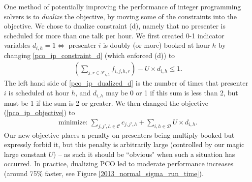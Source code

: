 \documentclass{svjour3}                     %
\begin{document}
One method of potentially improving the performance of integer programming solvers is to \emph{dualize} the objective, by moving some of the constraints into the objective. We chose to dualize constraint (d), namely that no presenter is scheduled for more than one talk per hour. We first created 0-1 indicator variables $d_{i,h} = 1 \iff $ presenter $i$ is doubly (or more) booked at hour $h$ by changing \ref{pco_ip_constraint_d} (which enforced (d)) to
\begin{gather}
	\left( \sum_{j,r \in \mathcal F_{i,h}} f_{i,j,h,r} \right) - U \times d_{i,h} \le 1. \label{pco_ip_dualized_d}
\end{gather}
The left hand side of \ref{pco_ip_dualized_d} is the number of times that presenter $i$ is scheduled at hour $h$, and $d_{i,h}$ may be 0 or 1 if this sum is less than 2, but must be 1 if the sum is 2 or greater. We then changed the objective (\ref{pco_ip_objective}) to 
\begin{gather}
	\text{minimize: } \sum_{j,j',h \in \mathcal C} c_{j,j',h} + \sum_{i,h \in \mathcal D} U \times d_{i,h}.
\end{gather}
Our new objective places a penalty on presenters being multiply booked but expressly forbid it, but this penalty is arbitrarily large (controlled by our magic large constant $U$) -- as such it should be ``obvious" when such a situation has occurred. In practice, dualizing PCO led to moderate performance increases (around 75\% faster, see Figure \ref{2013_normal_sigma_run_time}).
\end{document}
